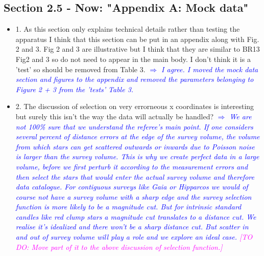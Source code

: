 \documentclass[10pt,a4paper]{article}
\newcommand{\Wilma}[1]{\textcolor{Magenta}{#1}}
\newcommand{\Comment}[1]{\textsl{\textcolor{Blue}{$\Longrightarrow$ {#1}}}}
\begin{document}
\subsection{Section 2.5 - Now: "Appendix A: Mock data"}
\begin{itemize}
\item 1. As this section only explains technical details rather than testing the apparatus I think that this section can be put in an appendix along with Fig. 2 and 3. Fig 2 and 3 are illustrative but I think that they are similar to BR13 Fig2 and 3 so do not need to appear in the main body. I don't think it is a 'test' so should be removed from Table 3. \Comment{I agree. I moved the mock data section and figures to the appendix and removed the parameters belonging to Figure 2 + 3 from the 'tests' Table 3.}
\item 2. The discussion of selection on very errorneous x coordinates is interesting but surely this isn't the way the data will actually be handled?
\Comment{We are not 100\% sure that we understand the referee's main point. If one considers several percent of distance errors at the edge of the survey volume, the volume from which stars can get scattered outwards or inwards due to Poisson noise is larger than the survey volume. This is why we create perfect data in a large volume, before we first perturb it according to the measurement errors and then select the stars that would enter the actual survey volume and therefore data catalogue. For contiguous surveys like Gaia or Hipparcos we would of course not have a survey volume with a sharp edge and the survey selection function is more likely to be a magnitude cut. But for intrinsic standard candles like red clump stars a magnitude cut translates to a distance cut. We realise it's idealized and there won't be a sharp distance cut. But scatter in and out of survey volume will play a role and we explore an ideal case. \Wilma{[TO DO: Move part of it to the above discussion of selection function.]}}
\end{itemize}
\end{document}
